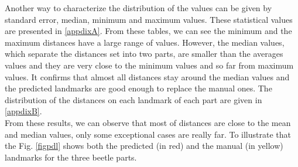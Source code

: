 \documentclass[review]{elsarticle}
\begin{document}
Another way to characterize the distribution of the values can be
given by standard error, median, minimum and maximum values. These
statistical values are presented in \ref{appdixA}. From these tables,
we can see the minimum and the maximum distances have a large range of
values. However, the median values, which separate the distances set
into two parts, are smaller than the averages values and they are very
close to the minimum values and so far from maximum values. It
confirms that almost all distances stay around the median values and
the predicted landmarks are good enough to replace the manual
ones. The distribution of the distances on each landmark of
each part are given in \ref{appdixB}.
\\
From these results, we can observe that most of distances are close to the mean and median
values, only some exceptional cases are really far. To illustrate that
the Fig. \ref{figpdl} shows both the predicted (in red) and the manual
(in yellow) landmarks for the three beetle parts.
\end{document}
